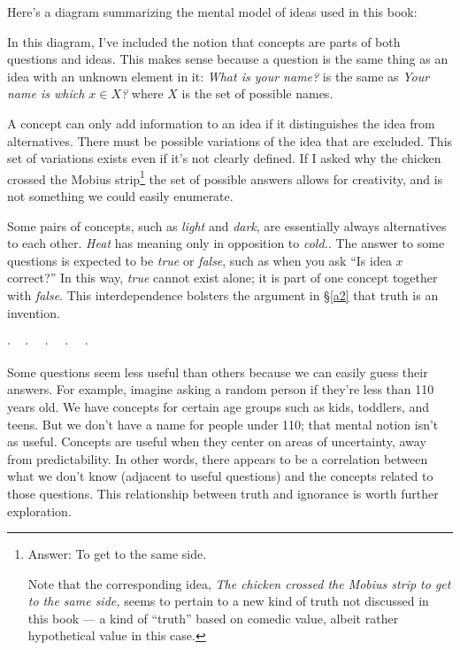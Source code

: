 \documentclass[9pt, twoside]{book}
\theoremstyle{argtstyle}
\newcommand{\dotq}{\cdot\quad}
\newcommand{\scenebreak}{
    \medskip\centerline{$\dotq\dotq\dotq\dotq\cdot$}\medskip
}
\begin{document}
Here's a diagram summarizing the mental model of ideas used in this
book:

\begin{center}
%
\end{center}

In this diagram, I've included the notion that concepts are parts of both
questions and ideas.
This makes sense because a question is the same thing as an idea
with an unknown element in it: {\em What is your name?} is the same as
{\em Your name is which $x\in X$?} where $X$ is the set of possible names.

A concept can only add information to an idea if it distinguishes the idea
from alternatives.
There must be possible variations of the idea that are excluded.
This set of variations exists even if it's not clearly defined.
If I asked why the chicken crossed the Mobius strip\footnote{Answer: To
get to the same side.\par Note that the corresponding idea, {\em The chicken
crossed the Mobius strip to get to the same side,} seems to pertain to a new
kind of truth not discussed in this book ---
a kind of ``truth'' based on comedic
value, albeit rather hypothetical value in this case.}
the set of possible answers allows for creativity, and is not something we could
easily enumerate.

Some pairs of concepts, such as {\em light} and {\em dark}, are essentially
always alternatives to each other.
{\em Heat} has meaning only in opposition to {\em cold.}.
The answer to some questions is expected to be {\em true} or {\em false},
such as when you ask ``Is idea $x$ correct?''
In this way, {\em true} cannot exist alone; it is part of one concept
together with {\em false}.
This interdependence bolsters the argument in \S\ref{a2} that truth is
an invention.

\scenebreak

Some questions seem less useful than others because we can easily guess their
answers.
For example,
imagine asking a random person if they're
less than 110 years old.
We have concepts for certain age groups such as kids,
toddlers, and teens.
But we don't have a name for people under 110;
that mental notion isn't as useful.
Concepts are useful when they center on
areas of uncertainty, away from predictability.
In other words, there appears to be a correlation between
what we don't know (adjacent to useful questions) and the concepts
related to those questions.
This relationship between truth and ignorance is worth further exploration.
\end{document}

